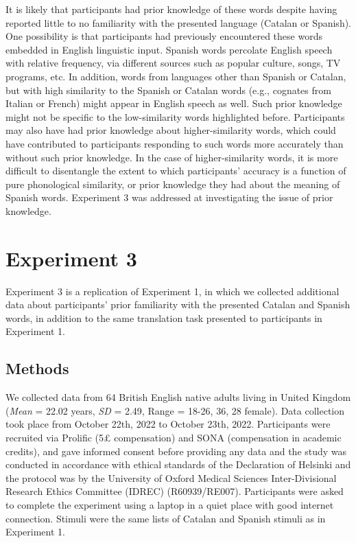 \documentclass[
]{article}
\begin{document}
It is likely that participants had prior knowledge of these words
despite having reported little to no familiarity with the presented
language (Catalan or Spanish). One possibility is that participants had
previously encountered these words embedded in English linguistic input.
Spanish words percolate English speech with relative frequency, via
different sources such as popular culture, songs, TV programs, etc. In
addition, words from languages other than Spanish or Catalan, but with
high similarity to the Spanish or Catalan words (e.g., cognates from
Italian or French) might appear in English speech as well. Such prior
knowledge might not be specific to the low-similarity words highlighted
before. Participants may also have had prior knowledge about
higher-similarity words, which could have contributed to participants
responding to such words more accurately than without such prior
knowledge. In the case of higher-similarity words, it is more difficult
to disentangle the extent to which participants' accuracy is a function
of pure phonological similarity, or prior knowledge they had about the
meaning of Spanish words. Experiment 3 was addressed at investigating
the issue of prior knowledge.

\section{Experiment 3}\label{experiment-3}

Experiment 3 is a replication of Experiment 1, in which we collected
additional data about participants' prior familiarity with the presented
Catalan and Spanish words, in addition to the same translation task
presented to participants in Experiment 1.

\subsection{Methods}\label{methods-2}

We collected data from 64 British English native adults living in United
Kingdom (\emph{Mean} = 22.02 years, \emph{SD} = 2.49, Range = 18-26, 36,
28 female). Data collection took place from October 22th, 2022 to
October 23th, 2022. Participants were recruited via Prolific (5£
compensation) and SONA (compensation in academic credits), and gave
informed consent before providing any data and the study was conducted
in accordance with ethical standards of the Declaration of Helsinki and
the protocol was by the University of Oxford Medical Sciences
Inter-Divisional Research Ethics Committee (IDREC) (R60939/RE007).
Participants were asked to complete the experiment using a laptop in a
quiet place with good internet connection. Stimuli were the same lists
of Catalan and Spanish stimuli as in Experiment 1.
\end{document}
